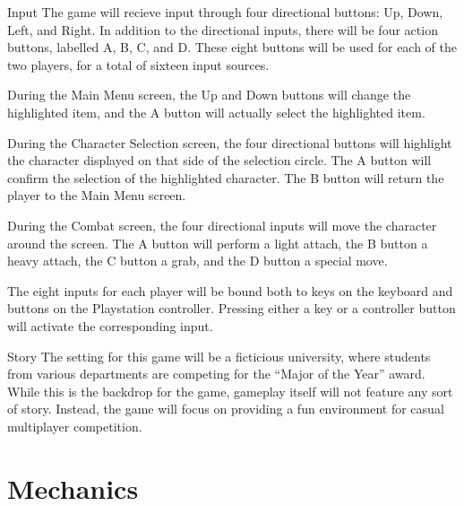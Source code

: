 \documentclass[12pt]{report}
\begin{document}
\begin{section}{Input}
The game will recieve input through four directional buttons: Up, Down, Left,
and Right. In addition to the directional inputs, there will be four action
buttons, labelled A, B, C, and D. These eight buttons will be used for each of
the two players, for a total of sixteen input sources.

During the Main Menu screen, the Up and Down buttons will change the highlighted
item, and the A button will actually select the highlighted item.

During the Character Selection screen, the four directional buttons will
highlight the character displayed on that side of the selection circle. The A
button will confirm the selection of the highlighted character. The B button
will return the player to the Main Menu screen.

During the Combat screen, the four directional inputs will move the character
around the screen. The A button will perform a light attach, the B button a
heavy attach, the C button a grab, and the D button a special move.

The eight inputs for each player will be bound both to keys on the keyboard and
buttons on the Playstation controller. Pressing either a key or a controller
button will activate the corresponding input.
\end{section}

\begin{section}{Story}
The setting for this game will be a ficticious university, where students from
various departments are competing for the ``Major of the Year'' award. While
this is the backdrop for the game, gameplay itself will not feature any sort
of story. Instead, the game will focus on providing a fun environment for
casual multiplayer competition.
\end{section}

\chapter{Mechanics}
\end{document}
